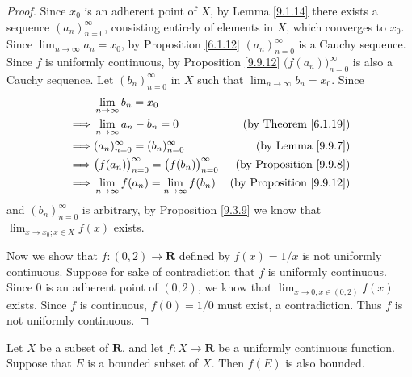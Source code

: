 \begin{proof}
    Since \(x_0\) is an adherent point of \(X\), by Lemma \ref{9.1.14} there exists a sequence \((a_n)_{n = 0}^\infty\), consisting entirely of elements in \(X\), which converges to \(x_0\).
    Since \(\lim_{n \to \infty} a_n = x_0\), by Proposition \ref{6.1.12} \((a_n)_{n = 0}^\infty\) is a Cauchy sequence.
    Since \(f\) is uniformly continuous, by Proposition \ref{9.9.12} \(\big(f(a_n)\big)_{n = 0}^\infty\) is also a Cauchy sequence.
    Let \((b_n)_{n = 0}^\infty\) in \(X\) such that \(\lim_{n \to \infty} b_n = x_0\).
    Since
    \begin{align*}
                 & \lim_{n \to \infty} b_n = x_0                                                                            \\
        \implies & \lim_{n \to \infty} a_n - b_n = 0                                 & \text{(by Theorem \ref{6.1.19})}     \\
        \implies & (a_n)_{n = 0}^\infty = (b_n)_{n = 0}^\infty                       & \text{(by Lemma \ref{9.9.7})}        \\
        \implies & \big(f(a_n)\big)_{n = 0}^\infty = \big(f(b_n)\big)_{n = 0}^\infty & \text{(by Proposition \ref{9.9.8})}  \\
        \implies & \lim_{n \to \infty} f(a_n) = \lim_{n \to \infty} f(b_n)           & \text{(by Proposition \ref{9.9.12})}
    \end{align*}
    and \((b_n)_{n = 0}^\infty\) is arbitrary, by Proposition \ref{9.3.9} we know that \(\lim_{x \to x_0 ; x \in X} f(x)\) exists.

    Now we show that \(f : (0, 2) \to \mathbf{R}\) defined by \(f(x) = 1 / x\) is not uniformly continuous.
    Suppose for sake of contradiction that \(f\) is uniformly continuous.
    Since \(0\) is an adherent point of \((0, 2)\), we know that \(\lim_{x \to 0 ; x \in (0, 2)} f(x)\) exists.
    Since \(f\) is continuous, \(f(0) = 1 / 0\) must exist, a contradiction.
    Thus \(f\) is not uniformly continuous.
\end{proof}

\begin{proposition}\label{9.9.15}
    Let \(X\) be a subset of \(\mathbf{R}\), and let \(f : X \to \mathbf{R}\) be a uniformly continuous function.
    Suppose that \(E\) is a bounded subset of \(X\).
    Then \(f(E)\) is also bounded.
\end{proposition}


